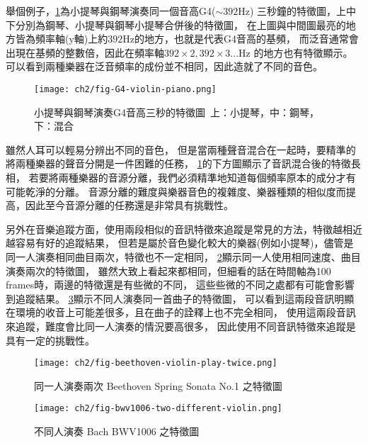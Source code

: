 \documentclass[class=NCU_thesis, crop=false]{standalone}
\begin{document}
舉個例子，\cref{fig:fig-ch2-G4-violin-piano}為小提琴與鋼琴演奏同一個音高G4($\sim 392$Hz)
三秒鐘的特徵圖，上中下分別為鋼琴、小提琴與鋼琴小提琴合併後的特徵圖，
在上圖與中間圖最亮的地方皆為頻率軸(y軸)上約$392$Hz的地方，也就是代表G4音高的基頻，
而泛音通常會出現在基頻的整數倍，因此在頻率軸$392\times 2, 392\times 3 ...$Hz
的地方也有特徵顯示。可以看到兩種樂器在泛音頻率的成份並不相同，因此造就了不同的音色。

\begin{figure}[H]
    \centering
    \texttt{[image: ch2/fig-G4-violin-piano.png]}
    \caption{小提琴與鋼琴演奏G4音高三秒的特徵圖\ 上：小提琴，中：鋼琴，下：混合}
    \label{fig:fig-ch2-G4-violin-piano}
\end{figure}

雖然人耳可以輕易分辨出不同的音色，
但是當兩種聲音混合在一起時，要精準的將兩種樂器的聲音分開是一件困難的任務，
\cref{fig:fig-ch2-G4-violin-piano}的下方圖顯示了音訊混合後的特徵長相，
若要將兩種樂器的音源分離，我們必須精準地知道每個頻率原本的成分才有可能乾淨的分離。
音源分離的難度與樂器音色的複雜度、樂器種類的相似度而提高，因此至今音源分離的任務還是非常具有挑戰性。

另外在音樂追蹤方面，使用兩段相似的音訊特徵來追蹤是常見的方法，特徵越相近越容易有好的追蹤結果，
但若是屬於音色變化較大的樂器(例如小提琴)，儘管是同一人演奏相同曲目兩次，特徵也不一定相同，
\cref{fig:fig-ch2-beethoven-violin-play-twice}顯示同一人使用相同速度、曲目演奏兩次的特徵圖，
雖然大致上看起來都相同，但細看的話在時間軸為100 frames時，兩邊的特徵還是有些微的不同，
這些些微的不同之處都有可能會影響到追蹤結果。
\cref{fig:fig-ch2-bwv1006-two-different-violin}顯示不同人演奏同一首曲子的特徵圖，
可以看到這兩段音訊明顯在環境的收音上可能差很多，且在曲子的詮釋上也不完全相同，
使用這兩段音訊來追蹤，難度會比同一人演奏的情況要高很多，
因此使用不同音訊特徵來追蹤是具有一定的挑戰性。

\begin{figure}[H]
    \centering
    \texttt{[image: ch2/fig-beethoven-violin-play-twice.png]}
    \caption{同一人演奏兩次 Beethoven Spring Sonata No.1 之特徵圖}
    \label{fig:fig-ch2-beethoven-violin-play-twice}
\end{figure}

\begin{figure}[H]
    \centering
    \texttt{[image: ch2/fig-bwv1006-two-different-violin.png]}
    \caption{不同人演奏 Bach BWV1006 之特徵圖}
    \label{fig:fig-ch2-bwv1006-two-different-violin}
\end{figure}
\end{document}
